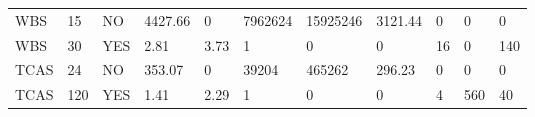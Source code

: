 \begin{table*}[]
\begin{tabular}{@{}lllllllllll@{}}
        WBS                                                      & 15                                                           & NO                                                                 & 4427.66                                                         & 0                                                                        & 7962624                                                        & 15925246                                                      & 3121.44                                                       & 0                                                                   & 0                                                                   & 0                                                           \\
        WBS                                                      & 30                                                           & YES                                                                & 2.81                                                            & 3.73                                                                     & 1                                                              & 0                                                             & 0                                                             & 16                                                                  & 0                                                                   & 140                                                         \\ \midrule
        TCAS                                                     & 24                                                           & NO                                                                 & 353.07                                                          & 0                                                                        & 39204                                                          & 465262                                                        & 296.23                                                        & 0                                                                   & 0                                                                   & 0                                                           \\
        TCAS                                                     & 120                                                          & YES                                                                & 1.41                                                            & 2.29                                                                     & 1                                                              & 0                                                             & 0                                                             & 4                                                                   & 560                                                                 & 40                                                          \\ \midrule

\end{tabular}
\end{table*}
